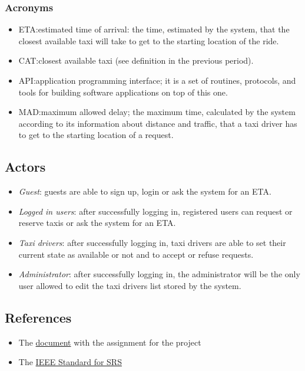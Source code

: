 \documentclass{article}
\begin{document}
\subsubsection{Acronyms}
\begin{itemize}
	\item ETA:\@ estimated time of arrival: the time, estimated by the system, that the closest available taxi will take to get to the starting location of the ride.
	\item CAT:\@ closest available taxi (see definition in the previous period).
	\item API:\@ application programming interface; it is a set of routines, protocols, and tools for building software applications on top of this one.
	\item MAD:\@ maximum allowed delay; the maximum time, calculated by the system according to its information about distance and traffic, that a taxi driver has to get to the starting location of a request. 
\end{itemize}
\subsection{Actors}
\begin{itemize}
	\item \textit{Guest}: guests are able to sign up, login or ask the system for an ETA.\@
	\item \textit{Logged in users}: after successfully logging in, registered users can request or reserve taxis or ask the system for an ETA.\@
	\item \textit{Taxi drivers}: after successfully logging in, taxi drivers are able to set their current state as available or not and to accept or refuse requests.
	\item \textit{Administrator}: after successfully logging in, the administrator will be the only user allowed to edit the taxi drivers list stored by the system.
\end{itemize}

\subsection{References}
\begin{itemize}
	\item The \href{run:./external_references/assignments.pdf}{document} with the assignment for the project
	\item The \href{run:./external_references/assignments.pdf}{IEEE Standard for SRS } 
\end{itemize}
\end{document}
